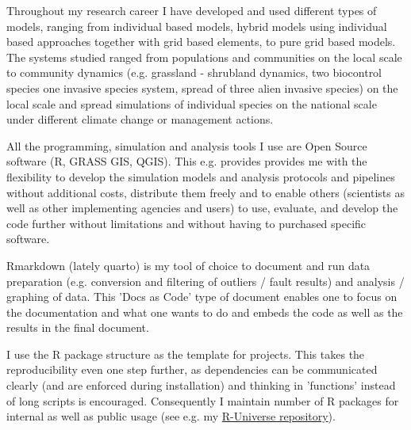 \documentclass[a4paper]{article}
\begin{document}
    


Throughout my research career I have developed and used different types of
	models, ranging from individual based models, hybrid models using
	individual based approaches together with grid based elements, to pure
	grid based models. The systems studied ranged from populations and
	communities on the local scale to community dynamics (e.g. grassland -
	shrubland dynamics, two biocontrol species one invasive species system,
	spread of three alien invasive species) on the local scale and spread
	simulations of individual species on the national scale under different
	climate change or management actions.

All the programming, simulation and analysis tools I use are Open
	Source software (R, GRASS GIS, QGIS). This e.g. provides provides me
	with the flexibility to develop the simulation models and analysis
	protocols and pipelines without additional costs, distribute them
	freely and to enable others (scientists as well as other implementing
	agencies and users) to use, evaluate, and develop the code further
	without limitations and without having to purchased specific
	software. 
	
Rmarkdown (lately quarto) is my tool of choice to document and run data
	preparation (e.g. conversion and filtering of outliers / fault
	results) and analysis / graphing of data. This 'Docs as Code' type of
	document enables one to focus on the documentation and what one wants
	to do and embeds the code as well as the results in the final document.

I use the R package structure as the template for projects. This takes
	the reproducibility even one step further, as dependencies can be
	communicated clearly (and are enforced during installation) and
	thinking in 'functions' instead of long scripts is encouraged.
	Consequently I maintain number of R packages for internal as well as
	public usage (see e.g. my
	\href{https://rkrug.r-universe.dev/builds}{R-Universe repository}).
\end{document}
